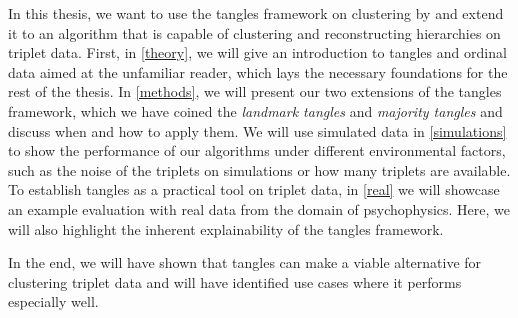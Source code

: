 In this thesis, we want to use the tangles framework on clustering by \cite{klepperClusteringTanglesAlgorithmic2021} and extend it to an algorithm that is capable of clustering and reconstructing
hierarchies on triplet data. First, in \autoref{theory}, we will give an introduction to tangles and ordinal data aimed at the unfamiliar reader, which lays
the necessary foundations for the rest of the thesis. 
In \autoref{methods}, we will present our two extensions of the tangles framework, which we have coined the \textit{landmark tangles} and \textit{majority tangles}
and discuss when and how to apply them.
We will use simulated data in \autoref{simulations} to show the performance of our algorithms under different environmental factors, such as the noise of the triplets on simulations or how many triplets are available. 
To establish tangles as a practical tool on triplet data, in \autoref{real} we will showcase an example evaluation with real data from the domain of psychophysics. 
Here, we will also highlight the inherent explainability of the tangles framework. 

In the end, we will have shown that tangles can make a viable alternative for clustering triplet data and will have identified use cases where it performs especially well.
